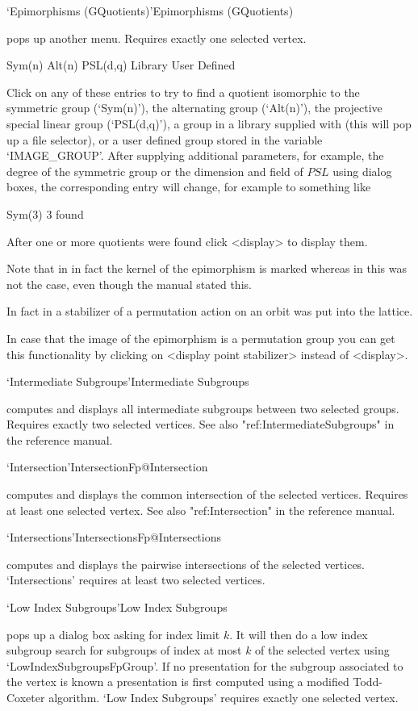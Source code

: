 \>`Epimorphisms (GQuotients)'{Epimorphisms (GQuotients)}

pops up another menu. Requires exactly one selected vertex.

\begintt
Sym(n)
Alt(n)
PSL(d,q)
Library
User Defined 
\endtt

Click on any of these entries to try to find a quotient isomorphic to the
symmetric group (`Sym(n)'), the alternating group (`Alt(n)'), the projective
special linear group (`PSL(d,q)'), a group in a library supplied with
{\XGAP} (this will pop up a file selector), or a user defined group stored
in the variable `IMAGE_GROUP'.  After supplying additional parameters, for
example, the degree of the symmetric group or the dimension and field of
$PSL$ using dialog boxes, the corresponding entry will change, for example
to something like

\begintt
Sym(3)        3 found
\endtt

After one or more quotients were found click <display> to display them.

Note that in {} in fact the kernel of the epimorphism is marked whereas 
in {} this was not the case, even though the {} manual stated
this.  

In fact in {} a stabilizer of a permutation action on an orbit was
put into the lattice.

In case that the image of the epimorphism is a permutation group you can
get this functionality by clicking on <display point stabilizer> instead of 
<display>. 

\>`Intermediate Subgroups'{Intermediate Subgroups}

computes and displays all intermediate subgroups between two selected
groups. Requires exactly two selected vertices. See also
"ref:IntermediateSubgroups" in the {\GAP} reference manual. 

\>`Intersection'{IntersectionFp}@{Intersection}

computes and displays the common intersection of the selected vertices.
Requires at least one selected vertex.  See also "ref:Intersection" in the
{\GAP} reference manual.

\>`Intersections'{IntersectionsFp}@{Intersections}

computes and   displays   the pairwise   intersections  of  the  selected
vertices.  `Intersections' requires at least two selected vertices.

\>`Low Index Subgroups'{Low Index Subgroups}

pops up a dialog box asking for index  limit $k$.  It  will then do a low
index subgroup search for  subgroups of index at  most $k$ of the selected
vertex using `LowIndexSubgroupsFpGroup'.    If no  presentation  for  the
subgroup   associated to  the vertex  is  known a  presentation  is first
computed using a  modified  Todd-Coxeter algorithm. `Low Index Subgroups'
requires  exactly one selected vertex.

